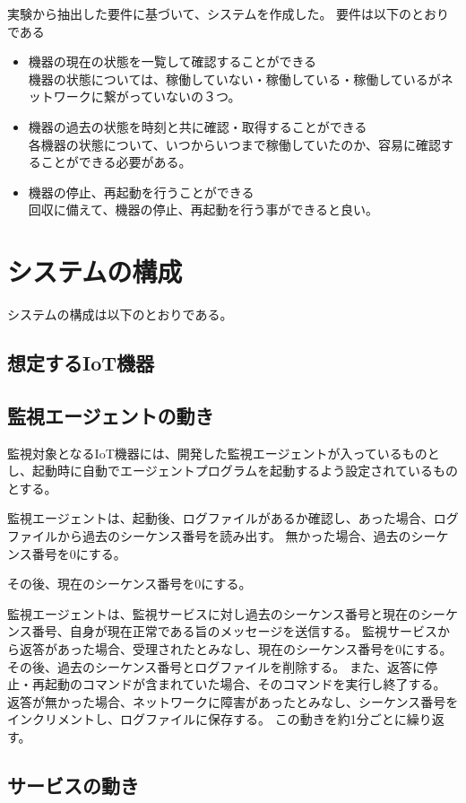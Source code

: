 実験から抽出した要件に基づいて、システムを作成した。
要件は以下のとおりである
\begin{itemize}
	\item 機器の現在の状態を一覧して確認することができる\\
		機器の状態については、稼働していない・稼働している・稼働しているがネットワークに繋がっていないの３つ。
	\item 機器の過去の状態を時刻と共に確認・取得することができる\\
		各機器の状態について、いつからいつまで稼働していたのか、容易に確認することができる必要がある。
	\item 機器の停止、再起動を行うことができる\\
		回収に備えて、機器の停止、再起動を行う事ができると良い。
\end{itemize}

\section{システムの構成}
システムの構成は以下のとおりである。
\subsection{想定するIoT機器}

\subsection{監視エージェントの動き}
監視対象となるIoT機器には、開発した監視エージェントが入っているものとし、起動時に自動でエージェントプログラムを起動するよう設定されているものとする。

監視エージェントは、起動後、ログファイルがあるか確認し、あった場合、ログファイルから過去のシーケンス番号を読み出す。
無かった場合、過去のシーケンス番号を0にする。

その後、現在のシーケンス番号を0にする。


監視エージェントは、監視サービスに対し過去のシーケンス番号と現在のシーケンス番号、自身が現在正常である旨のメッセージを送信する。
監視サービスから返答があった場合、受理されたとみなし、現在のシーケンス番号を0にする。
その後、過去のシーケンス番号とログファイルを削除する。
また、返答に停止・再起動のコマンドが含まれていた場合、そのコマンドを実行し終了する。
返答が無かった場合、ネットワークに障害があったとみなし、シーケンス番号をインクリメントし、ログファイルに保存する。
この動きを約1分ごとに繰り返す。

\subsection{サービスの動き}
